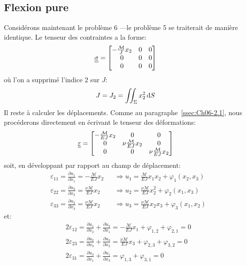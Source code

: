 \subsection{Flexion pure} \label{ssec:Ch07-1.3}
Considérons maintenant le problème 6 ---le problème 5 se traiterait de manière identique.
Le tenseur des contraintes a la forme:
\begin{equation}
    \underline{\underline{\sigma}} = 
    \begin{bmatrix}
        -\frac{\mathcal{M}}{J}x_2 & 0 & 0 \\
        0 & 0 & 0 \\
        0 & 0 & 0
    \end{bmatrix}
    \label{eq:Ch07-025}
\end{equation}
où l'on a supprimé l'indice $2$ sur $J$:
\begin{equation}
    J=J_2 = \iint_{\Sigma} x_2^2 \mathop{\mathrm{{}d}}\mathopen{} S
    \label{eq:Ch07-026}
\end{equation}
Il reste à calculer les déplacements.
Comme au paragraphe~\ref{ssec:Ch06-2.1}, nous procéderons directement en écrivant le tenseur des déformations:
\begin{equation}
    \underline{\underline{\varepsilon}} = 
    \begin{bmatrix}
        -\frac{\mathcal{M}}{EJ}x_2 & 0 & 0 \\
        0 & \nu\frac{\mathcal{M}}{EJ}x_2 & 0 \\
        0 & 0 & \nu\frac{\mathcal{M}}{EJ}x_2
    \end{bmatrix}
    \label{eq:Ch07-027}
\end{equation}
soit, en développant par rapport au champ de déplacement:
\begin{equation}
    \begin{aligned}
       & \varepsilon_{11} = \frac{\partial u_1}{\partial x_1} = -\frac{\mathcal{M}}{EJ}x_2 && \Rightarrow u_1 = \frac{\mathcal{M}}{EJ}x_1x_2 + \varphi_1 \left( x_2,x_3 \right) \\
       & \varepsilon_{22} = \frac{\partial u_2}{\partial x_2} = \frac{\nu\mathcal{M}}{EJ}x_2 && \Rightarrow u_2 = \frac{\nu\mathcal{M}}{EJ}x_2^2 + \varphi_2 \left( x_1,x_3 \right) \\
       & \varepsilon_{33} = \frac{\partial u_3}{\partial x_3} = \frac{\nu\mathcal{M}}{EJ}x_2 && \Rightarrow u_3 = \frac{\nu\mathcal{M}}{EJ}x_2x_3 + \varphi_3 \left( x_1,x_2 \right)
    \end{aligned}
    \label{eq:Ch07-028}
\end{equation}
et:
\begin{equation}
    \begin{aligned}
       & 2 \varepsilon_{12} = \frac{\partial u_1}{\partial x_2} + \frac{\partial u_2}{\partial x_1} = - \frac{\mathcal{M}}{EJ}x_1 + \varphi_{1,2} + \varphi_{2,1} = 0 \\
       & 2 \varepsilon_{23} = \frac{\partial u_2}{\partial x_3} + \frac{\partial u_3}{\partial x_2} = \frac{\nu\mathcal{M}}{EJ}x_3 + \varphi_{2,3} + \varphi_{3,2} = 0 \\
      &  2 \varepsilon_{31} = \frac{\partial u_3}{\partial x_1} + \frac{\partial u_1}{\partial x_3} = \varphi_{1,3} + \varphi_{3,1} = 0
    \end{aligned}
    \label{eq:Ch07-029}
\end{equation}
